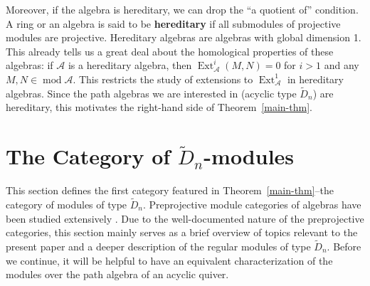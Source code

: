 \documentclass[11pt]{amsart}
\theoremstyle{plain}
\theoremstyle{definition}
\numberwithin{equation}{section}
\renewcommand{\mod}{\operatorname{mod}}
\newcommand{\Ext}{\operatorname{Ext}}
\begin{document}
Moreover, if the algebra is hereditary, we can drop the ``a quotient of'' condition.
A ring or an algebra is said to be \textbf{hereditary} if all submodules of projective modules are projective.
Hereditary algebras are algebras with global dimension 1.
This already tells us a great deal about the homological properties of these algebras: if $\mathcal{A}$ is a hereditary algebra, then $\Ext^i_{\mathcal{A}}(M,N) = 0$ for $i > 1$ and any $M,N \in \mod \mathcal{A}$.
This restricts the study of extensions to $\Ext^1_{\mathcal{A}}$ in hereditary algebras.
Since the path algebras we are interested in (acyclic type $\widetilde{D}_n$) are hereditary, this motivates the right-hand side of Theorem~\ref{main-thm}.

\section{The Category of $\widetilde{D}_n$-modules}
This section defines the first category featured in Theorem~\ref{main-thm}--the category of modules of type $\widetilde{D}_n$. 
Preprojective module categories of algebras have been studied extensively \cite{assem_elements_2006,auslander_representation_1995,draxler_existence_1996,gabriel_representations_1997,geis_rigid_2006,geis_rigid_2007,ringel_tame_1984,simson_elements_2007}.
Due to the well-documented nature of the preprojective categories, this section mainly serves as a brief overview of topics relevant to the present paper and a deeper description of the regular modules of type $\widetilde{D}_n$.
Before we continue, it will be helpful to have an equivalent characterization of the modules over the path algebra of an acyclic quiver.
\end{document}
